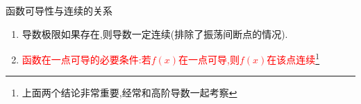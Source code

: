 \documentclass[8pt a4paper, oneside, UTF8]{ctexbook}  %
\begin{document}
\begin{sloppypar}
\begin{criterion}{函数可导性与连续的关系}{}
\begin{enumerate}
\begin{proof}[导数若存在有振荡间断点的证明:]
                      以函数$F(x)=\begin{cases}
                              x^2 \sin \dfrac{1}{x} ,x \neq 0 \\
                              0,x=0
                          \end{cases}$为例:
                      \\根据导数定义对函数在$x=0$处求导:$F'(0)=\lim_{x\to 0}\dfrac{F(x)-F(0)}{x-0}=\lim_{x\to 0}\dfrac{x^2 \sin \frac1x - 0}{x}=\lim_{x\to 0}x \sin \dfrac{1}{x}=0$因此函数$F(x)$在$x=0$处导数存在.那么对函数求导:\\
                      $F'(x)=\begin{cases}
                              2x \sin \dfrac{1}{x} -\cos \dfrac{1}{x} ,x\neq 0 \\
                              0 ,x=0
                          \end{cases}$,那么易知$\lim_{x\to 0}\left(2 x \sin \dfrac{1}{x} -\cos \dfrac{1}{x} \right)$是振荡的.虽然函数导数存在,但是这是振荡间断点.
                  \end{proof}
                  上述推论还可以用几何来解释.如果$x=0$处的导数存在,那么其函数图像在原点一定有切线.
                  \begin{figure}[H]
                      \begin{minipage}[t]{0.5\linewidth}
                          \centering
                          \texttt{[image: 3.2.3.eps]}
                          \caption{振荡间断点函数$\sin \dfrac{1}{x}$图像}
                      \end{minipage}%
                      \begin{minipage}[t]{0.5\linewidth}
                          \centering
                          \texttt{[image: 1.2.2.eps]}
                          \caption{双曲余弦函数$y=\dfrac{e^x+e^{-x}}{2}$}
                      \end{minipage}
                  \end{figure}
                  同时,导数振荡的话,则导数极限不存在,由此可以推出衍生推论:导数极限定理\ref{dsjxdl}
            \item 导数极限如果存在,则导数一定连续(排除了振荡间断点的情况).
            \item \textcolor{red}{函数在一点可导的必要条件:若$f(x)$在一点可导,则$f(x)$在该点连续}\footnote{上面两个结论非常重要,经常和高阶导数一起考察}
        \end{enumerate}
    \end{criterion}

\end{sloppypar}
\end{document}
